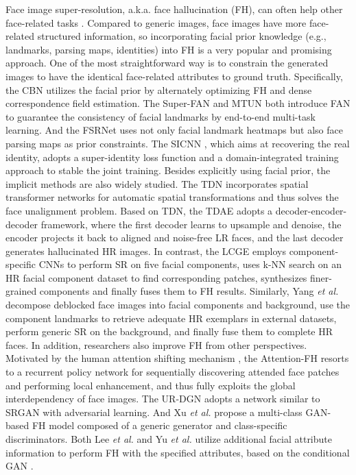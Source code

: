 {Face image super-resolution, a.k.a. face hallucination (FH), can often help other face-related tasks .  
Compared to generic images, face images have more face-related structured information, so incorporating facial prior knowledge (e.g., landmarks, parsing maps, identities) into FH is a very popular and promising approach.
One of the most straightforward way is to constrain the generated images to have the identical face-related attributes to ground truth.
Specifically, the CBN  utilizes the facial prior by alternately optimizing FH and dense correspondence field estimation.
The Super-FAN  and MTUN  both introduce FAN to guarantee the consistency of facial landmarks by end-to-end multi-task learning.
And the FSRNet  uses not only facial landmark heatmaps but also face parsing maps as prior constraints.
The SICNN , which aims at recovering the real identity, adopts a super-identity loss function and a domain-integrated training approach to stable the joint training.
Besides explicitly using facial prior, the implicit methods are also widely studied.
The TDN  incorporates spatial transformer networks  for automatic spatial transformations and thus solves the face unalignment problem.
Based on TDN, the TDAE  adopts a decoder-encoder-decoder framework, where the first decoder learns to upsample and denoise, the encoder projects it back to aligned and noise-free LR faces, and the last decoder generates hallucinated HR images.
In contrast, the LCGE  employs component-specific CNNs to perform SR on five facial components, uses k-NN search on an HR facial component dataset to find corresponding patches, synthesizes finer-grained components and finally fuses them to FH results.
Similarly, Yang \textit{et al.}  decompose deblocked face images into facial components and background, use the component landmarks to retrieve adequate HR exemplars in external datasets, perform generic SR on the background, and finally fuse them to complete HR faces.
In addition, researchers also improve FH from other perspectives.
Motivated by the human attention shifting mechanism , the Attention-FH  resorts to a recurrent policy network for sequentially discovering attended face patches and performing local enhancement, and thus fully exploits the global interdependency of face images.
The UR-DGN  adopts a network similar to SRGAN  with adversarial learning.
And Xu \textit{et al.}  propose a multi-class GAN-based FH model composed of a generic generator and class-specific discriminators.
Both Lee \textit{et al.}  and Yu \textit{et al.}  utilize additional facial attribute information to perform FH with the specified attributes, based on the conditional GAN .

}
